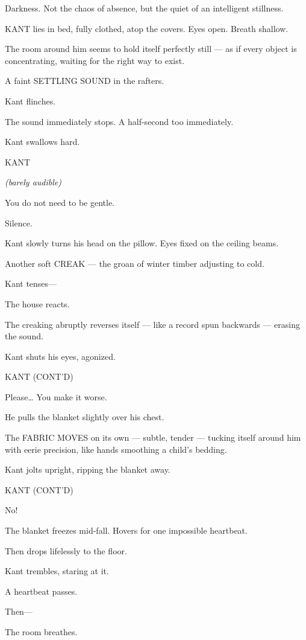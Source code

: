 \documentclass[12pt]{article}
\newenvironment{dialogue}[1]{%
  \vspace{0.8\baselineskip}%
  \noindent\hspace*{2.3in}\textsc{#1}\par%
  \noindent\hspace*{1.5in}\begin{minipage}[t]{4.5in}%
}{%
  \end{minipage}\par%
}
\newcommand{\paren}[1]{%
  \noindent\hspace*{1.8in}\textit{(#1)}\par%
}
\begin{document}
Darkness.
Not the chaos of absence, but the quiet of an intelligent stillness.

KANT lies in bed, fully clothed, atop the covers.
Eyes open.
Breath shallow.

The room around him seems to hold itself perfectly still —
as if every object is concentrating, waiting for the right way to exist.

A faint SETTLING SOUND in the rafters.

Kant flinches.

The sound immediately stops.
A half-second too immediately.

Kant swallows hard.

\begin{dialogue}{KANT}
\paren{barely audible}
You do not need to be gentle.
\end{dialogue}

Silence.

Kant slowly turns his head on the pillow.
Eyes fixed on the ceiling beams.

Another soft CREAK —
the groan of winter timber adjusting to cold.

Kant tenses—

The house reacts.

The creaking abruptly reverses itself —
like a record spun backwards —
erasing the sound.

Kant shuts his eyes, agonized.

\begin{dialogue}{KANT (CONT’D)}
Please…
You make it worse.
\end{dialogue}

He pulls the blanket slightly over his chest.

The FABRIC MOVES on its own —
subtle, tender —
tucking itself around him with eerie precision,
like hands smoothing a child’s bedding.

Kant jolts upright, ripping the blanket away.

\begin{dialogue}{KANT (CONT’D)}
No!
\end{dialogue}

The blanket freezes mid-fall.
Hovers for one impossible heartbeat.

Then drops lifelessly to the floor.

Kant trembles, staring at it.

A heartbeat passes.

Then—

The room breathes.
\end{document}
